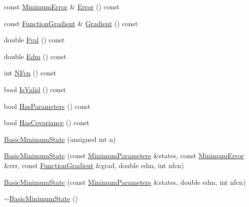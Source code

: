 \begin{DoxyCompactItemize}
const \mbox{\hyperlink{classROOT_1_1Minuit2_1_1MinimumError}{Minimum\+Error}} \& \mbox{\hyperlink{classROOT_1_1Minuit2_1_1BasicMinimumState_a67a7536f33473e23c3461e0c7029e5c5}{Error}} () const
\item 
const \mbox{\hyperlink{classROOT_1_1Minuit2_1_1FunctionGradient}{Function\+Gradient}} \& \mbox{\hyperlink{classROOT_1_1Minuit2_1_1BasicMinimumState_a45b6c728054b409349fb2f6f725a8ab6}{Gradient}} () const
\item 
double \mbox{\hyperlink{classROOT_1_1Minuit2_1_1BasicMinimumState_a5151d99e7c6cd7f3b070ad2c62222010}{Fval}} () const
\item 
double \mbox{\hyperlink{classROOT_1_1Minuit2_1_1BasicMinimumState_a20ae93898c8b726d9e36c40160d23fa9}{Edm}} () const
\item 
int \mbox{\hyperlink{classROOT_1_1Minuit2_1_1BasicMinimumState_ac4566e929ac5ec9fe2dba914bb21207b}{N\+Fcn}} () const
\item 
bool \mbox{\hyperlink{classROOT_1_1Minuit2_1_1BasicMinimumState_af92e32efe08fa047bc433db6f058d11a}{Is\+Valid}} () const
\item 
bool \mbox{\hyperlink{classROOT_1_1Minuit2_1_1BasicMinimumState_a1af83c0464c727dc173834c1612f5e49}{Has\+Parameters}} () const
\item 
bool \mbox{\hyperlink{classROOT_1_1Minuit2_1_1BasicMinimumState_a9d43155058c576759d062561d77b3e1d}{Has\+Covariance}} () const
\item 
\mbox{\hyperlink{classROOT_1_1Minuit2_1_1BasicMinimumState_a5442cd6f54e10c1a7e888d013393fbf6}{Basic\+Minimum\+State}} (unsigned int n)
\item 
\mbox{\hyperlink{classROOT_1_1Minuit2_1_1BasicMinimumState_af7498cdda17a96e7a93dbd22862a73cc}{Basic\+Minimum\+State}} (const \mbox{\hyperlink{classROOT_1_1Minuit2_1_1MinimumParameters}{Minimum\+Parameters}} \&states, const \mbox{\hyperlink{classROOT_1_1Minuit2_1_1MinimumError}{Minimum\+Error}} \&err, const \mbox{\hyperlink{classROOT_1_1Minuit2_1_1FunctionGradient}{Function\+Gradient}} \&grad, double edm, int nfcn)
\item 
\mbox{\hyperlink{classROOT_1_1Minuit2_1_1BasicMinimumState_ac01b76fd4f72db80c4e86766c51a5f44}{Basic\+Minimum\+State}} (const \mbox{\hyperlink{classROOT_1_1Minuit2_1_1MinimumParameters}{Minimum\+Parameters}} \&states, double edm, int nfcn)
\item 
\mbox{\hyperlink{classROOT_1_1Minuit2_1_1BasicMinimumState_ae9724fa5e9d8a2f5403ac0a131bfbe91}{$\sim$\+Basic\+Minimum\+State}} ()
\item 

\end{DoxyCompactItemize}
